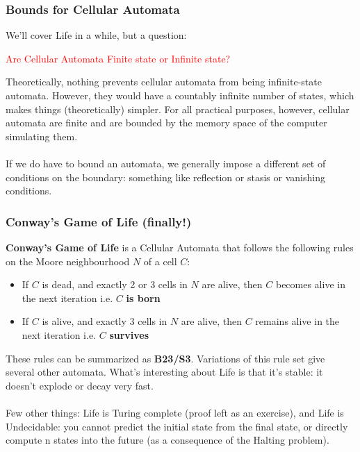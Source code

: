 \documentclass{beamer}
\begin{document}
\begin{frame}
\end{frame}

\begin{frame}
\frametitle{Bounds for Cellular Automata}
\begin{flushleft}

We'll cover Life in a while, but a question: 
\end{flushleft}
\pause
\begin{center}\begin{Large}\textcolor{red}{
Are Cellular Automata Finite state or Infinite state?}
\end{Large}\end{center}
\pause

\begin{flushleft}
Theoretically, nothing prevents cellular automata from being infinite-state
automata. However, they would have a countably infinite number of states,
which makes things (theoretically) simpler. For all practical purposes,
however, cellular automata are finite and are bounded by the memory space of
the computer simulating them. \\~\\
\pause
If we do have to bound an automata, we generally impose a different set of 
conditions on the boundary: something like reflection or stasis or vanishing
conditions.
\end{flushleft}
\end{frame}

\begin{frame}
\frametitle{Conway's Game of Life   {\tiny (finally!)}}
\begin{flushleft}
\textbf{Conway's Game of Life} is a Cellular Automata that follows the following
rules on the Moore neighbourhood $N$ of a cell $C$:
\pause
\begin{itemize}
\item{If $C$ is dead, and exactly 2 or 3 cells in $N$ are alive, then $C$ becomes
alive in the next iteration i.e. $C$ \textbf{is born}}
\pause
\item{If $C$ is alive, and exactly 3 cells in $N$ are alive, then $C$ remains 
alive in the next iteration i.e. $C$ \textbf{survives}}
\end{itemize}
\pause
These rules can be summarized as \textbf{B23/S3}. Variations of this rule set
give several other automata. What's interesting about Life is that it's stable:
it doesn't explode or decay very fast. \\~\\
\pause
Few other things: Life is Turing complete   {\tiny (proof left as an exercise)},
and Life is Undecidable: you cannot predict the initial state from the final
state, or directly compute n states into the future (as a consequence of the 
Halting problem).
\end{flushleft}
\end{frame}
\end{document}
